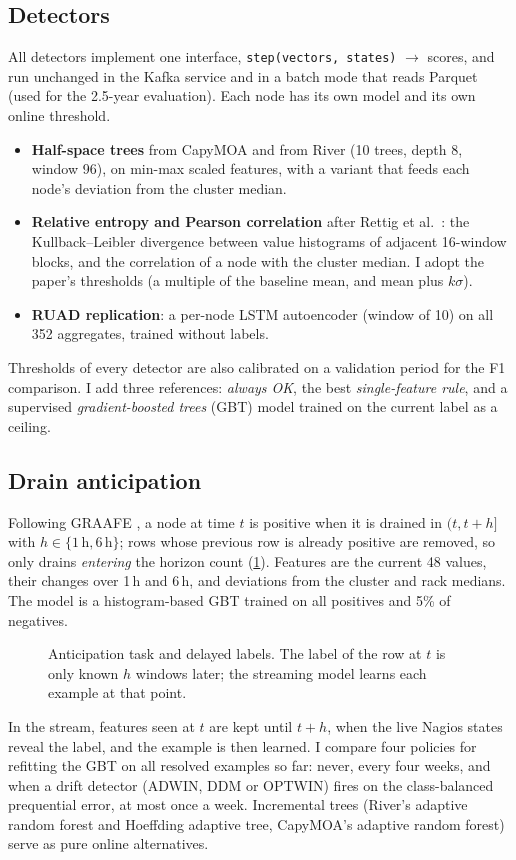 \subsection{Detectors}
All detectors implement one interface, \texttt{step(vectors, states)} $\to$ scores, and run unchanged in the Kafka service and in a batch mode that reads Parquet (used for the 2.5-year evaluation). Each node has its own model and its own online threshold.
\begin{itemize}
  \item \textbf{Half-space trees} \cite{tan2011hst} from CapyMOA and from River (10 trees, depth 8, window 96), on min-max scaled features, with a variant that feeds each node's deviation from the cluster median.
  \item \textbf{Relative entropy and Pearson correlation} after Rettig et al.\ \cite{rettig2015online}: the Kullback--Leibler divergence between value histograms of adjacent 16-window blocks, and the correlation of a node with the cluster median. I adopt the paper's thresholds (a multiple of the baseline mean, and mean plus $k\sigma$).
  \item \textbf{RUAD replication}: a per-node LSTM autoencoder (window of 10) on all 352 aggregates, trained without labels.
\end{itemize}
Thresholds of every detector are also calibrated on a validation period for the F1 comparison. I add three references: \emph{always OK}, the best \emph{single-feature rule}, and a supervised \emph{gradient-boosted trees} (GBT) model \cite{friedman2001gbm,pedregosa2011sklearn} trained on the current label as a ceiling.

\subsection{Drain anticipation}
Following GRAAFE \cite{molan2024graafe}, a node at time $t$ is positive when it is drained in $(t, t{+}h]$ with $h\in\{1\,\text{h},6\,\text{h}\}$; rows whose previous row is already positive are removed, so only drains \emph{entering} the horizon count (\cref{fig:task}). Features are the current 48 values, their changes over 1\,h and 6\,h, and deviations from the cluster and rack medians. The model is a histogram-based GBT trained on all positives and 5\% of negatives.

\begin{figure}[t]
\centering

\caption{Anticipation task and delayed labels. The label of the row at $t$ is only known $h$ windows later; the streaming model learns each example at that point.}
\label{fig:task}
\end{figure}

In the stream, features seen at $t$ are kept until $t{+}h$, when the live Nagios states reveal the label, and the example is then learned. I compare four policies for refitting the GBT on all resolved examples so far: never, every four weeks, and when a drift detector (ADWIN, DDM or OPTWIN) fires on the class-balanced prequential error, at most once a week. Incremental trees (River's adaptive random forest and Hoeffding adaptive tree, CapyMOA's adaptive random forest) serve as pure online alternatives.
